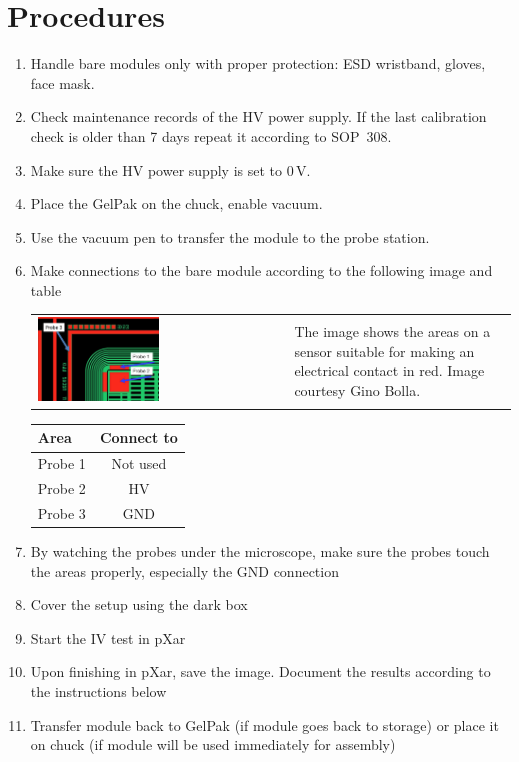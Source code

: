\documentclass[10pt]{unlsilabsop}
\begin{document}
\section{Procedures}

\begin{enumerate}
\item Handle bare modules only with proper protection: ESD wristband, gloves, face mask.
\item Check maintenance records of the HV power supply. If the last calibration check is older than 7 days repeat it according to SOP~308.
\item Make sure the HV power supply is set to 0\,V.
\item Place the GelPak on the chuck, enable vacuum.
\item Use the vacuum pen to transfer the module to the probe station.
\item Make connections to the bare module according to the following image and table

\begin{tabular}{p{}p{}}
\includegraphics[width=0.5\textwidth]{img/SensorProbePositions.png} &
The image shows the areas on a sensor suitable for making an electrical contact in red. Image courtesy Gino Bolla.
\end{tabular}

\begin{tabular}{lc}
\toprule
Area & Connect to \\
\midrule
Probe 1 & Not used \\
Probe 2 & HV \\
Probe 3 & GND \\
\bottomrule
\end{tabular}
\item By watching the probes under the microscope, make sure the probes touch the areas properly, especially the GND connection
\item Cover the setup using the dark box
\item Start the IV test in pXar
\item Upon finishing in pXar, save the image. Document the results according to the instructions below
\item Transfer module back to GelPak (if module goes back to storage) or place it on chuck (if module will be used immediately for assembly)
\end{enumerate}
\end{document}
